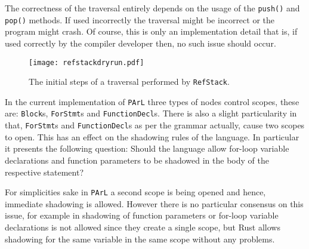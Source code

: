 



\begin{marker}
The correctness of the traversal entirely depends on the usage
of the \texttt{push()} and \texttt{pop()} methods. If used
incorrectly the traversal might be incorrect or the program
might crash. Of course, this is only an implementation detail
that is, if used correctly by the compiler developer then, no
such issue should occur.
\end{marker}

\begin{figure}[H]
\centering
\begin{mdframed}[backgroundcolor=OffWhite]
\texttt{[image: refstackdryrun.pdf]}
\end{mdframed}
\caption{The initial steps of a traversal performed by
\texttt{RefStack}.}
\label{fig:refstackdryrun}
\end{figure}

In the current implementation of \texttt{PArL} three types of
nodes control scopes, these are: \texttt{Block}s,
\texttt{ForStmt}s and \texttt{FunctionDecl}s. There is also a
slight particularity in that, \texttt{ForStmt}s and
\texttt{FunctionDecl}s as per the grammar actually, cause two
scopes to open. This has an effect on the shadowing rules of the
language. In particular it presents the following question:
Should the language allow for-loop variable declarations and
function parameters to be shadowed in the body of the respective
statement?

For simplicities sake in \texttt{PArL} a second scope is being
opened and hence, immediate shadowing is allowed. However there
is no particular consensus on this issue, for example in \CC{}
shadowing of function parameters or for-loop variable
declarations is not allowed since they create a single scope,
but Rust allows shadowing for the same variable in the same
scope without any problems.


